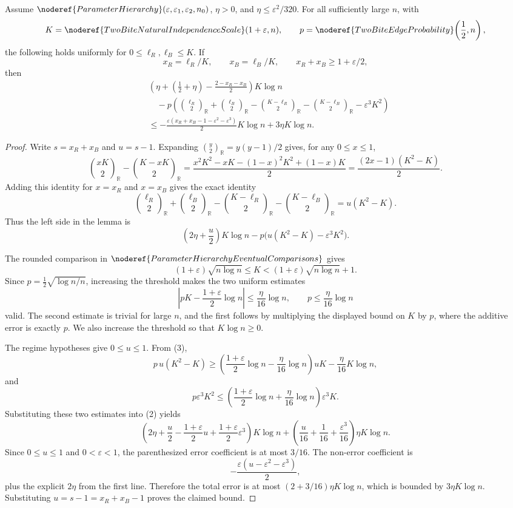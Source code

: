 \begin{lemma}
Assume \(\noderef{ParameterHierarchy}(\varepsilon,\varepsilon_1,\varepsilon_2,n_0)\),
\(\eta>0\), and \(\eta\le\varepsilon^2/320\).  For all sufficiently large
\(n\), with
\[
K=\noderef{TwoBiteNaturalIndependenceScale}(1+\varepsilon,n),
\qquad
p=\noderef{TwoBiteEdgeProbability}\!\left(\frac12,n\right),
\]
the following holds uniformly for \(0\le\ell_R,\ell_B\le K\).  If
\[
x_R=\ell_R/K,\qquad x_B=\ell_B/K,\qquad
x_R+x_B\ge1+\varepsilon/2,
\]
then
\[
\begin{aligned}
&\left(\eta+\left(\frac12+\eta\right)-\frac{2-x_R-x_B}{2}\right)K\log n\\
&\quad
-p\left(
\binom{\ell_R}{2}_{\mathbb R}+\binom{\ell_B}{2}_{\mathbb R}
-\binom{K-\ell_R}{2}_{\mathbb R}
-\binom{K-\ell_B}{2}_{\mathbb R}
-\varepsilon^3K^2\right)\\
&\le
-\frac{\varepsilon(x_R+x_B-1-\varepsilon^2-\varepsilon^3)}{2}K\log n
+3\eta K\log n .
\end{aligned}
\]
\end{lemma}
\begin{proof}
Write \(s=x_R+x_B\) and \(u=s-1\).  Expanding
\(\binom y2_{\mathbb R}=y(y-1)/2\) gives, for any \(0\le x\le1\),
\[
\binom{xK}{2}_{\mathbb R}-\binom{K-xK}{2}_{\mathbb R}
=\frac{x^2K^2-xK-(1-x)^2K^2+(1-x)K}{2}
=\frac{(2x-1)(K^2-K)}{2}.
\]
Adding this identity for \(x=x_R\) and \(x=x_B\) gives the exact identity
\[
\binom{\ell_R}{2}_{\mathbb R}+\binom{\ell_B}{2}_{\mathbb R}
-\binom{K-\ell_R}{2}_{\mathbb R}
-\binom{K-\ell_B}{2}_{\mathbb R}
=u(K^2-K). \tag{1}
\]
Thus the left side in the lemma is
\[
\left(2\eta+\frac{u}{2}\right)K\log n
-p\bigl(u(K^2-K)-\varepsilon^3K^2\bigr). \tag{2}
\]

The rounded comparison in \(\noderef{ParameterHierarchyEventualComparisons}\)
gives
\[
(1+\varepsilon)\sqrt{n\log n}\le K
<(1+\varepsilon)\sqrt{n\log n}+1.
\]
Since \(p=\frac12\sqrt{\log n/n}\), increasing the threshold makes the two
uniform estimates
\[
\left|pK-\frac{1+\varepsilon}{2}\log n\right|
\le \frac{\eta}{16}\log n,
\qquad
p\le \frac{\eta}{16}\log n
\tag{3}
\]
valid.  The second estimate is trivial for large \(n\), and the first follows
by multiplying the displayed bound on \(K\) by \(p\), where the additive error is
exactly \(p\).  We also increase the threshold so that \(K\log n\ge0\).

The regime hypotheses give \(0\le u\le1\).  From (3),
\[
p\,u(K^2-K)
\ge
\left(\frac{1+\varepsilon}{2}\log n-\frac{\eta}{16}\log n\right)uK
-\frac{\eta}{16}K\log n,
\]
and
\[
p\varepsilon^3K^2
\le
\left(\frac{1+\varepsilon}{2}\log n+\frac{\eta}{16}\log n\right)
\varepsilon^3K.
\]
Substituting these two estimates into (2) yields
\[
\left(
2\eta+\frac{u}{2}
-\frac{1+\varepsilon}{2}u
+\frac{1+\varepsilon}{2}\varepsilon^3
\right)K\log n
+\left(\frac{u}{16}+\frac1{16}+\frac{\varepsilon^3}{16}\right)\eta K\log n.
\]
Since \(0\le u\le1\) and \(0<\varepsilon<1\), the parenthesized error
coefficient is at most \(3/16\).  The non-error coefficient is
\[
-\frac{\varepsilon(u-\varepsilon^2-\varepsilon^3)}{2},
\]
plus the explicit \(2\eta\) from the first line.  Therefore the total error is
at most \((2+3/16)\eta K\log n\), which is bounded by \(3\eta K\log n\).
Substituting \(u=s-1=x_R+x_B-1\) proves the claimed bound.
\end{proof}
